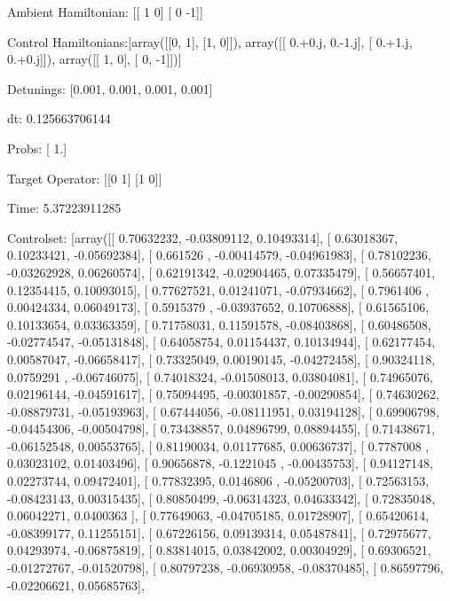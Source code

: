 \documentclass{article}
\begin{document}
    

\newpage

Ambient Hamiltonian: [[ 1  0]
 [ 0 -1]]

Control Hamiltonians:[array([[0, 1],
       [1, 0]]), array([[ 0.+0.j,  0.-1.j],
       [ 0.+1.j,  0.+0.j]]), array([[ 1,  0],
       [ 0, -1]])]

Detunings: [0.001, 0.001, 0.001, 0.001]

 dt: 0.125663706144

Probs: [ 1.]

Target Operator: [[0 1]
 [1 0]]

Time: 5.37223911285

Controlset: [array([[ 0.70632232, -0.03809112,  0.10493314],
       [ 0.63018367,  0.10233421, -0.05692384],
       [ 0.661526  , -0.00414579, -0.04961983],
       [ 0.78102236, -0.03262928,  0.06260574],
       [ 0.62191342, -0.02904465,  0.07335479],
       [ 0.56657401,  0.12354415,  0.10093015],
       [ 0.77627521,  0.01241071, -0.07934662],
       [ 0.7961406 ,  0.00424334,  0.06049173],
       [ 0.5915379 , -0.03937652,  0.10706888],
       [ 0.61565106,  0.10133654,  0.03363359],
       [ 0.71758031,  0.11591578, -0.08403868],
       [ 0.60486508, -0.02774547, -0.05131848],
       [ 0.64058754,  0.01154437,  0.10134944],
       [ 0.62177454,  0.00587047, -0.06658417],
       [ 0.73325049,  0.00190145, -0.04272458],
       [ 0.90324118,  0.0759291 , -0.06746075],
       [ 0.74018324, -0.01508013,  0.03804081],
       [ 0.74965076,  0.02196144, -0.04591617],
       [ 0.75094495, -0.00301857, -0.00290854],
       [ 0.74630262, -0.08879731, -0.05193963],
       [ 0.67444056, -0.08111951,  0.03194128],
       [ 0.69906798, -0.04454306, -0.00504798],
       [ 0.73438857,  0.04896799,  0.08894455],
       [ 0.71438671, -0.06152548,  0.00553765],
       [ 0.81190034,  0.01177685,  0.00636737],
       [ 0.7787008 ,  0.03023102,  0.01403496],
       [ 0.90656878, -0.1221045 , -0.00435753],
       [ 0.94127148,  0.02273744,  0.09472401],
       [ 0.77832395,  0.0146806 , -0.05200703],
       [ 0.72563153, -0.08423143,  0.00315435],
       [ 0.80850499, -0.06314323,  0.04633342],
       [ 0.72835048,  0.06042271,  0.0400363 ],
       [ 0.77649063, -0.04705185,  0.01728907],
       [ 0.65420614, -0.08399177,  0.11255151],
       [ 0.67226156,  0.09139314,  0.05487841],
       [ 0.72975677,  0.04293974, -0.06875819],
       [ 0.83814015,  0.03842002,  0.00304929],
       [ 0.69306521, -0.01272767, -0.01520798],
       [ 0.80797238, -0.06930958, -0.08370485],
       [ 0.86597796, -0.02206621,  0.05685763],
\end{document}
